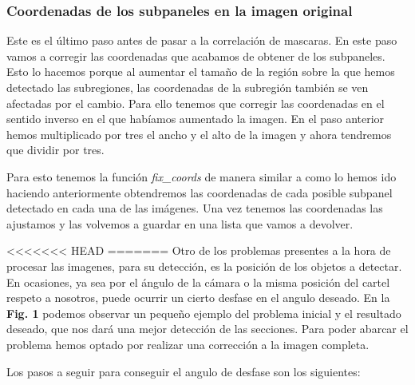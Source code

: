 \documentclass[a4paper, 12pt]{article}
\begin{document}
\subsubsection{Coordenadas de los subpaneles en la imagen original}
Este es el último paso antes de pasar a la correlación de mascaras. En este paso vamos a corregir las coordenadas que acabamos de obtener de los subpaneles. Esto lo hacemos porque al aumentar el tamaño de la región sobre la que hemos detectado las subregiones, las coordenadas de la subregión también se ven afectadas por el cambio. Para ello tenemos que corregir las coordenadas en el sentido inverso en el que habíamos aumentado la imagen. En el paso anterior hemos multiplicado por tres el ancho y el alto de la imagen y ahora tendremos que dividir por tres. 

Para esto tenemos la función \textit{fix\_coords} de manera similar a como lo hemos ido haciendo anteriormente obtendremos las coordenadas de cada posible subpanel detectado en cada una de las imágenes. Una vez tenemos las coordenadas las ajustamos y las volvemos a guardar en una lista que vamos a devolver. 

<<<<<<< HEAD
=======
Otro de los problemas presentes a la hora de procesar las imagenes, para su detección, es la posición de los objetos a detectar. En ocasiones, ya sea por el ángulo de la cámara o la misma posición del cartel respeto a nosotros, puede ocurrir un cierto desfase en el angulo deseado. En la \textbf{Fig. 1} podemos observar un pequeño ejemplo del problema inicial y el resultado deseado, que nos dará una mejor detección de las secciones. Para poder abarcar el problema hemos optado por realizar una corrección a la imagen completa. 

Los pasos a seguir para conseguir el angulo de desfase son los siguientes:
\end{document}
